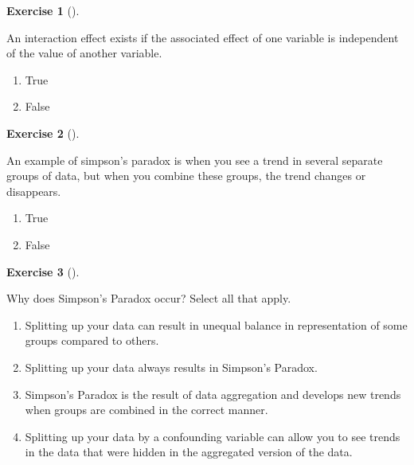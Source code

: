 \documentclass[
  letterpaper,
  DIV=11,
  numbers=noendperiod]{scrreprt}
\providecommand{\tightlist}{%
  \setlength{\itemsep}{0pt}\setlength{\parskip}{0pt}}\usepackage{longtable,booktabs,array}
\theoremstyle{definition}
\newtheorem{exercise}{Exercise}[chapter]
\theoremstyle{remark}
\begin{document}
\begin{exercise}[]\protect\hypertarget{exr-ch06-c03}{}\label{exr-ch06-c03}

An interaction effect exists if the associated effect of one variable is
independent of the value of another variable.

\begin{enumerate}
\def\labelenumi{\alph{enumi})}
\tightlist
\item
  True
\item
  False
\end{enumerate}

\end{exercise}

\begin{exercise}[]\protect\hypertarget{exr-ch06-c04}{}\label{exr-ch06-c04}

An example of simpson's paradox is when you see a trend in several
separate groups of data, but when you combine these groups, the trend
changes or disappears.

\begin{enumerate}
\def\labelenumi{\alph{enumi})}
\tightlist
\item
  True
\item
  False
\end{enumerate}

\end{exercise}

\begin{exercise}[]\protect\hypertarget{exr-ch06-c05}{}\label{exr-ch06-c05}

Why does Simpson's Paradox occur? Select all that apply.

\begin{enumerate}
\def\labelenumi{\alph{enumi})}
\tightlist
\item
  Splitting up your data can result in unequal balance in representation
  of some groups compared to others.
\item
  Splitting up your data always results in Simpson's Paradox.
\item
  Simpson's Paradox is the result of data aggregation and develops new
  trends when groups are combined in the correct manner.
\item
  Splitting up your data by a confounding variable can allow you to see
  trends in the data that were hidden in the aggregated version of the
  data.
\end{enumerate}

\end{exercise}
\end{document}
